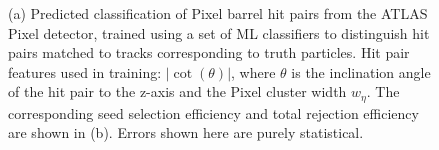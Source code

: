 \begin{figure}[htbp!] 
    \centering
    \hfill%
    \caption{(a) Predicted classification of Pixel barrel hit pairs from the ATLAS Pixel detector, trained using a set of ML classifiers to distinguish hit pairs matched to tracks corresponding to truth particles. Hit pair features used in training: $\lvert \cot(\theta) \rvert$, where $\theta$ is the inclination angle of the hit pair to the z-axis and the Pixel cluster width $w_{\eta}$. The corresponding seed selection efficiency and total rejection efficiency are shown in (b). Errors shown here are purely statistical.}
\end{figure}






